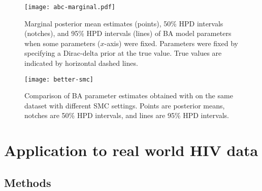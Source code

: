 \begin{figure}[ht]
    \centering
    \texttt{[image: abc-marginal.pdf]}
    \caption[
        Marginal posterior mean estimates and 50\%/95\% \gls{HPD} intervals of
        \gls{BA} model parameters when some parameters were fixed.
    ]{
        Marginal posterior mean estimates (points), 50\% \gls{HPD} intervals
        (notches), and 95\% \gls{HPD} intervals (lines) of \gls{BA} model
        parameters when some parameters ($x$-axis) were fixed. Parameters were
        fixed by specifying a Dirac-delta prior at the true value. True values
        are indicated by horizontal dashed lines.
    }
    \label{fig:marginal}
\end{figure}

\begin{figure}[ht]
    \centering
    \texttt{[image: better-smc]}
    \caption[
        Comparison of \gls{BA} parameter estimates obtained with
         on the same dataset with different \gls{SMC}
        settings.
    ]{
        Comparison of \gls{BA} parameter estimates obtained with
         on the same dataset with different \gls{SMC}
        settings. Points are posterior means, notches are 50\% \gls{HPD}
        intervals, and lines are 95\% \gls{HPD} intervals.
    }
    \label{fig:better}
\end{figure}

\section{Application to real world HIV data}
\label{sec:hiv}

\subsection{Methods}

